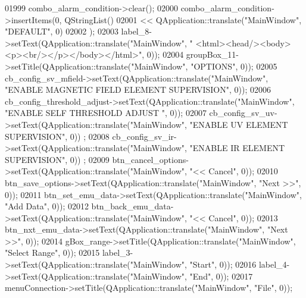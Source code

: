 \begin{DoxyCode}
01999         combo\_alarm\_condition->clear();
02000         combo\_alarm\_condition->insertItems(0, QStringList()
02001          << QApplication::translate(\textcolor{stringliteral}{"MainWindow"}, \textcolor{stringliteral}{"DEFAULT"}, 0)
02002         );
02003         label\_8->setText(QApplication::translate(\textcolor{stringliteral}{"MainWindow"}, \textcolor{stringliteral}{"
      <html><head/><body><p><br/></p></body></html>"}, 0));
02004         groupBox\_11->setTitle(QApplication::translate(\textcolor{stringliteral}{"MainWindow"}, \textcolor{stringliteral}{"OPTIONS"}, 0));
02005         cb\_config\_sv\_mfield->setText(QApplication::translate(\textcolor{stringliteral}{"MainWindow"}, \textcolor{stringliteral}{"ENABLE MAGNETIC FIELD ELEMENT
       SUPERVISION"}, 0));
02006         cb\_config\_threshold\_adjust->setText(QApplication::translate(\textcolor{stringliteral}{"MainWindow"}, \textcolor{stringliteral}{"ENABLE SELF THRESHOLD
       ADJUST "}, 0));
02007         cb\_config\_sv\_uv->setText(QApplication::translate(\textcolor{stringliteral}{"MainWindow"}, \textcolor{stringliteral}{"ENABLE UV ELEMENT SUPERVISION"}, 0))
      ;
02008         cb\_config\_sv\_ir->setText(QApplication::translate(\textcolor{stringliteral}{"MainWindow"}, \textcolor{stringliteral}{"ENABLE IR ELEMENT SUPERVISION"}, 0))
      ;
02009         btn\_cancel\_options->setText(QApplication::translate(\textcolor{stringliteral}{"MainWindow"}, \textcolor{stringliteral}{"<< Cancel"}, 0));
02010         btn\_save\_options->setText(QApplication::translate(\textcolor{stringliteral}{"MainWindow"}, \textcolor{stringliteral}{"Next >>"}, 0));
02011         btn\_set\_emu\_data->setText(QApplication::translate(\textcolor{stringliteral}{"MainWindow"}, \textcolor{stringliteral}{"Add Data"}, 0));
02012         btn\_back\_emu\_data->setText(QApplication::translate(\textcolor{stringliteral}{"MainWindow"}, \textcolor{stringliteral}{"<< Cancel"}, 0));
02013         btn\_nxt\_emu\_data->setText(QApplication::translate(\textcolor{stringliteral}{"MainWindow"}, \textcolor{stringliteral}{"Next >>"}, 0));
02014         gBox\_range->setTitle(QApplication::translate(\textcolor{stringliteral}{"MainWindow"}, \textcolor{stringliteral}{"Select Range"}, 0));
02015         label\_3->setText(QApplication::translate(\textcolor{stringliteral}{"MainWindow"}, \textcolor{stringliteral}{"Start"}, 0));
02016         label\_4->setText(QApplication::translate(\textcolor{stringliteral}{"MainWindow"}, \textcolor{stringliteral}{"End"}, 0));
02017         menuConnection->setTitle(QApplication::translate(\textcolor{stringliteral}{"MainWindow"}, \textcolor{stringliteral}{"File"}, 0));

\end{DoxyCode}
